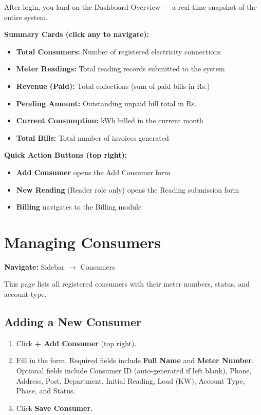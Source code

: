 \documentclass[12pt, a4paper]{report}
\begin{document}
After login, you land on the Dashboard Overview — a real-time snapshot of the entire system.

\textbf{Summary Cards (click any to navigate):}
\begin{itemize}[leftmargin=1.5em]
    \item \textbf{Total Consumers:} Number of registered electricity connections
    \item \textbf{Meter Readings:} Total reading records submitted to the system
    \item \textbf{Revenue (Paid):} Total collections (sum of paid bills in Rs.)
    \item \textbf{Pending Amount:} Outstanding unpaid bill total in Rs.
    \item \textbf{Current Consumption:} kWh billed in the current month
    \item \textbf{Total Bills:} Total number of invoices generated
\end{itemize}

\textbf{Quick Action Buttons (top right):}
\begin{itemize}[leftmargin=1.5em]
    \item \textbf{Add Consumer} opens the Add Consumer form
    \item \textbf{New Reading} (Reader role only) opens the Reading submission form
    \item \textbf{Billing} navigates to the Billing module
\end{itemize}

\section{Managing Consumers}

\textbf{Navigate:} Sidebar $\rightarrow$ Consumers

This page lists all registered consumers with their meter numbers, status, and account type.

\subsection{Adding a New Consumer}
\begin{enumerate}
    \item Click \textbf{+ Add Consumer} (top right).
    \item Fill in the form. Required fields include \textbf{Full Name} and \textbf{Meter Number}. Optional fields include Consumer ID (auto-generated if left blank), Phone, Address, Post, Department, Initial Reading, Load (KW), Account Type, Phase, and Status.
    \item Click \textbf{Save Consumer}.
\end{enumerate}
\end{document}
